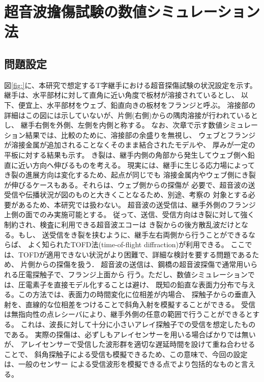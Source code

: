 ﻿\chapter{超音波擔傷試験の数値シミュレーション法}
\section{問題設定}
図\ref{fig:}に、本研究で想定するT字継手における超音探傷試験の状況設定を示す。
継手は、水平部材に対して直角に近い角度で板材が溶接されているとし、
以下、便宜上、水平部材をウェブ、鉛直向きの板材をフランジと呼ぶ。
溶接部の詳細はこの図には示していないが、片側(右側)からの隅肉溶接が行われているとし、
継手右側を外側、左側を内側と称する。
なお、次章で示す数値シミュレーション結果では、比較のために、溶接部の余盛りを無視し、
ウェブとフランジが溶接金属が追加されることなくそのまま結合されたモデルや、
厚みが一定の平板に対する結果も示す。
き裂は、継手内側の角部から発生してウェブ側へ鉛直に近い方向へ伸びるものを考える。
現実には、継手に生じる応力場によってき裂の進展方向は変化するため、起点が同じでも
溶接金属内やウェブ側にき裂が伸びるケースもある。それらは、ウェブ側からの探傷が
必要で、超音波の送受信や伝播状況が図のものと大きくことなるため、別途、考察の
対象とする必要があるため、本研究では扱わない。
超音波の送受信は、継手外側のフランジ上側の面でのみ実施可能とする。
従って、送信、受信方向はき裂に対して強く制約され、検査に利用できる超音波エコーは
き裂からの後方散乱波だけとなる。もし、
送受信をき裂を挟むように、継手左右両側から行うことができるならば、
よく知られたTOFD法(time-of-flight diffraction)が利用できる。
ここでは、TOFDが適用できない状況がより困難で、詳細な検討を要する問題であるため、
片側からの探傷を扱う．
超音波の送信は、鋼橋の超音波探傷で通常用いられる圧電探触子で、フランジ上面から
行う。ただし、数値シミュレーションでは、圧電素子を直接モデル化することは避け、
既知の鉛直な表面力分布で与える。この方法では、表面力の時間変化に位相差が内場合、
探触子からの垂直入射を、直線的な位相差をつけることで斜角入射を模擬することができる。
受信は無指向性の点レシーバにより、継手外側の任意の範囲で行うことができるとする。
これは、波長に対して十分に小さいアレイ探触子での受信を想定したものである。
実際の探傷は、必ずしもアレイセンサーを用いる場合ばかりでは無いが、
アレイセンサーで受信した波形群を適切な遅延時間を設けて重ね合わせることで、
斜角探触子による受信も模擬できるため、この意味で、今回の設定は、一般のセンサー
による受信波形を模擬できる点でより包括的なものと言える。
